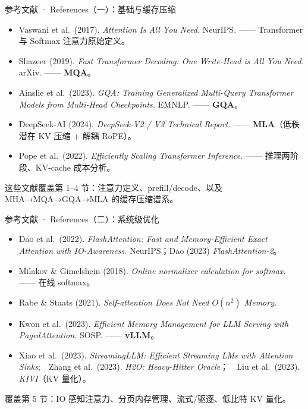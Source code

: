 \documentclass[aspectratio=169,10pt]{beamer}
\begin{document}
\begin{frame}{参考文献 · References（一）：基础与缓存压缩}
  \footnotesize
  \begin{itemize}
    \item Vaswani et al.\ (2017). \emph{Attention Is All You Need.} NeurIPS. —— Transformer 与 Softmax 注意力原始定义。
    \item Shazeer (2019). \emph{Fast Transformer Decoding: One Write-Head is All You Need.} arXiv. —— \textbf{MQA}。
    \item Ainslie et al.\ (2023). \emph{GQA: Training Generalized Multi-Query Transformer Models from Multi-Head Checkpoints.} EMNLP. —— \textbf{GQA}。
    \item DeepSeek-AI (2024). \emph{DeepSeek-V2 / V3 Technical Report.} —— \textbf{MLA}（低秩潜在 KV 压缩 + 解耦 RoPE）。
    \item Pope et al.\ (2022). \emph{Efficiently Scaling Transformer Inference.} —— 推理两阶段、KV-cache 成本分析。
  \end{itemize}
  \vspace{2pt}
  \textcolor{TLinkSoft}{这些文献覆盖第 1--4 节：注意力定义、prefill/decode、以及 MHA→MQA→GQA→MLA 的缓存压缩谱系。}
\end{frame}

\begin{frame}{参考文献 · References（二）：系统级优化}
  \footnotesize
  \begin{itemize}
    \item Dao et al.\ (2022). \emph{FlashAttention: Fast and Memory-Efficient Exact Attention with IO-Awareness.} NeurIPS；Dao (2023) \emph{FlashAttention-2}。
    \item Milakov \& Gimelshein (2018). \emph{Online normalizer calculation for softmax.} —— 在线 softmax。
    \item Rabe \& Staats (2021). \emph{Self-attention Does Not Need $O(n^2)$ Memory.}
    \item Kwon et al.\ (2023). \emph{Efficient Memory Management for LLM Serving with PagedAttention.} SOSP. —— \textbf{vLLM}。
    \item Xiao et al.\ (2023). \emph{StreamingLLM: Efficient Streaming LMs with Attention Sinks};\ \ Zhang et al.\ (2023). \emph{H2O: Heavy-Hitter Oracle}；\ \ Liu et al.\ (2023). \emph{KIVI}（KV 量化）。
  \end{itemize}
  \vspace{2pt}
  \textcolor{TLinkSoft}{覆盖第 5 节：IO 感知注意力、分页内存管理、流式/驱逐、低比特 KV 量化。}
\end{frame}
\end{document}
